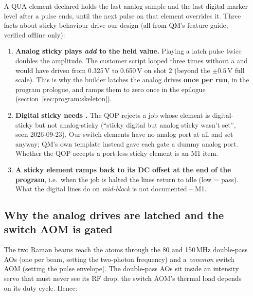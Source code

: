 A QUA element declared  holds the last analog sample and the last digital marker
level after a pulse ends, until the next pulse on that element overrides it.
Three facts about sticky behaviour drive our design (all from QM's feature
guide, verified offline only):

\begin{enumerate}[nosep]
  \item \textbf{Analog sticky plays \emph{add} to the held value.} Playing a
    latch pulse twice doubles the amplitude. The customer script
     looped three times without a
     and would have driven  from 0.325\,V to
    0.650\,V on shot 2 (beyond the $\pm 0.5$\,V full scale). This is why the
    builder latches the analog drives \textbf{once per run}, in the program
    prologue, and ramps them to zero once in the epilogue
    (section~\ref{sec:program:skeleton}).
  \item \textbf{Digital sticky needs .} The QOP rejects a
    job whose element is digital-sticky but not analog-sticky (``sticky
    digital but analog sticky wasn't set'', seen 2026-09-23). Our switch
    elements have no analog port at all and set  anyway;
    QM's own template instead gave each gate a dummy analog port. Whether
    the QOP accepts a port-less sticky element is an M1 item.
  \item \textbf{A sticky element ramps back to its DC offset at the end of
    the program}, i.e.\ when the job is halted the lines return to idle (low =
    pass). What the digital lines do on  \emph{mid-block} is
    not documented -- M1.
\end{enumerate}

\subsection{Why the analog drives are latched and the switch AOM is gated}

The two Raman beams reach the atoms through the 80 and 150\,MHz double-pass
AOs (one per beam, setting the two-photon frequency) and a \emph{common}
switch AOM (setting the pulse envelope). The double-pass AOs sit inside an
intensity servo that must never see its RF drop; the switch AOM's thermal
load depends on its duty cycle. Hence:

